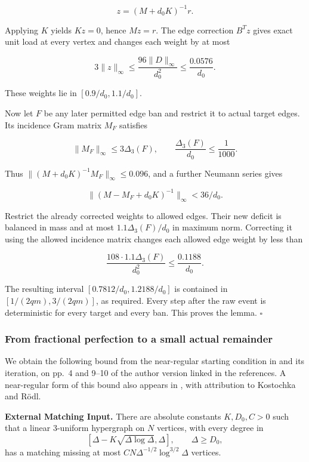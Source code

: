 \documentclass[11pt,a4paper]{article}
\newcommand{\statementstart}{\par\addvspace{6pt plus 1pt minus 1pt}\noindent}
\begin{document}
\[
z=(M+d_0K)^{-1}r.
\]

Applying \(K\) yields \(Kz=0\), hence \(Mz=r\). The edge correction \(B^Tz\) gives exact unit load at every vertex and changes each weight by at most

\[
3\|z\|_\infty
\le\frac{96\|D\|_\infty}{d_0^2}
\le\frac{0.0576}{d_0}.
\]

These weights lie in \([0.9/d_0,1.1/d_0]\).

Now let \(F\) be any later permitted edge ban and restrict it to actual target edges. Its incidence Gram matrix \(M_F\) satisfies

\[
\|M_F\|_\infty\le3\Delta_3(F),\qquad
\frac{\Delta_3(F)}{d_0}\le\frac1{1000}.
\]

Thus \(\|(M+d_0K)^{-1}M_F\|_\infty\le0.096\), and a further Neumann series gives

\[
\|(M-M_F+d_0K)^{-1}\|_\infty<36/d_0.
\]

Restrict the already corrected weights to allowed edges. Their new deficit is balanced in mass and at most \(1.1\Delta_3(F)/d_0\) in maximum norm. Correcting it using the allowed incidence matrix changes each allowed edge weight by less than

\[
\frac{108\cdot1.1\Delta_3(F)}{d_0^2}
\le\frac{0.1188}{d_0}.
\]

The resulting interval \([0.7812/d_0,1.2188/d_0]\) is contained in \([1/(2qm),3/(2qm)]\), as required. Every step after the raw event is deterministic for every target and every ban. This proves the lemma. \(\square\)

\hypertarget{from-fractional-perfection-to-a-small-actual-remainder}{%
\subsubsection{From fractional perfection to a small actual remainder}\label{from-fractional-perfection-to-a-small-actual-remainder}}

We obtain the following bound from the near-regular starting condition in \cite[Theorem 2.1]{AKS97} and its iteration, on pp.~4 and 9--10 of the author version linked in the references. A near-regular form of this bound also appears in \cite[preprint v1, Theorem 2.2]{ARS23}, with attribution to Kostochka and Rödl.

\statementstart\textbf{External Matching Input.} There are absolute constants \(K,D_0,C>0\) such that a linear 3-uniform hypergraph on \(N\) vertices, with every degree in \[
[\Delta-K\sqrt{\Delta\log\Delta},\Delta],\qquad\Delta\ge D_0,
\] has a matching missing at most \(CN\Delta^{-1/2}\log^{3/2}\Delta\) vertices.
\end{document}
